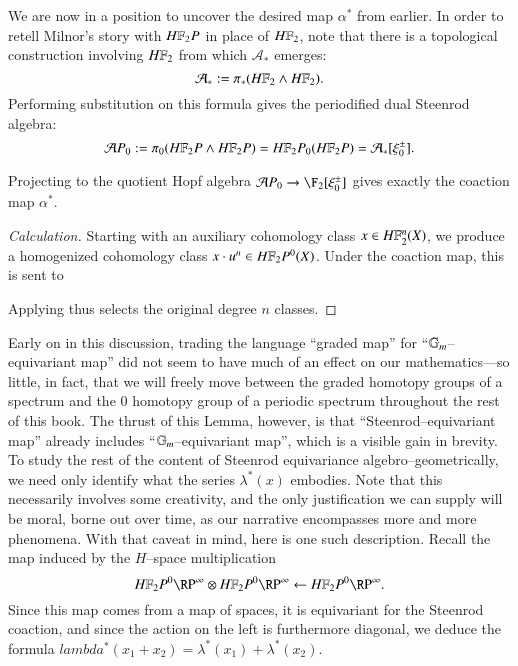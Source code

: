 We are now in a position to uncover the desired map $\alpha^*$ from earlier.  In order to retell Milnor's story with $\HFtwo P$ in place of $\HFtwo$, note that there is a topological construction involving $\HFtwo$ from which $\mathcal A_*$ emerges: \[\mathcal A_* := \pi_*(\HFtwo \sm \HFtwo).\]  Performing substitution on this formula gives the periodified dual Steenrod algebra: \[\mathcal AP_0 := \pi_0 (\HFtwo P \sm \HFtwo P) = \HFtwo P_0(\HFtwo P) = \mathcal A_*[\xi_0^\pm].\]

\begin{lemma}
Projecting to the quotient Hopf algebra $\mathcal AP_0 \to \F_2[\xi_0^\pm]$ gives exactly the coaction map $\alpha^*$.
\end{lemma}
\begin{proof}[Calculation]
Starting with an auxiliary cohomology class $x \in \HFtwo^n(X)$, we produce a homogenized cohomology class $x \cdot u^n \in \HFtwo P^0(X)$.  Under the coaction map, this is sent to
\begin{center}
\end{center}
Applying  thus selects the original degree $n$ classes.
\end{proof}

Early on in this discussion, trading the language ``graded map'' for ``$\mathbb G_m$--equivariant map'' did not seem to have much of an effect on our mathematics---so little, in fact, that we will freely move between the graded homotopy groups of a spectrum and the $0${\th} homotopy group of a periodic spectrum throughout the rest of this book.  The thrust of this Lemma, however, is that ``Steenrod--equivariant map'' already includes ``$\mathbb G_m$--equivariant map'', which is a visible gain in brevity.  To study the rest of the content of Steenrod equivariance algebro--geometrically, we need only identify what the series $\lambda^*(x)$ embodies.  Note that this necessarily involves some creativity, and the only justification we can supply will be moral, borne out over time, as our narrative encompasses more and more phenomena.  With that caveat in mind, here is one such description.  Recall the map induced by the $H$--space multiplication \[\HFtwo P^0 \RP^\infty \otimes \HFtwo P^0 \RP^\infty \leftarrow \HFtwo P^0 \RP^\infty.\]  Since this map comes from a map of spaces, it is equivariant for the Steenrod coaction, and since the action on the left is furthermore diagonal, we deduce the formula $lambda^*(x_1 + x_2) = \lambda^*(x_1) + \lambda^*(x_2)$.

